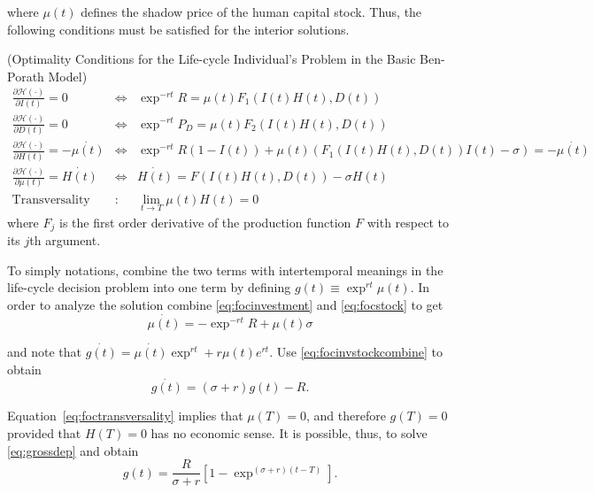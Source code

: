 \noindent where $\mu(t)$ defines the shadow price of the human capital stock. Thus, the following conditions must be satisfied for the interior solutions.

\begin{condition} (Optimality Conditions for the Life-cycle Individual's Problem in the Basic Ben-Porath Model) 
\begin{eqnarray}
\frac{\partial \mathcal{H} (\cdot)}{\partial I(t)} = 0 &\Leftrightarrow& \exp^{-rt}R = \mu(t) F_{1} \left( I(t) H(t), D(t) \right) \label{eq:focinvestment} \\
\frac{\partial \mathcal{H} (\cdot)}{\partial D(t)} = 0 &\Leftrightarrow& \exp^{-rt}P_D = \mu(t) F_{2} \left( I(t) H(t), D(t) \right) \label{eq:focgoods} \\
\frac{\partial \mathcal{H} (\cdot)}{\partial H(t)} = - \dot{\mu(t)} &\Leftrightarrow& \exp^{-rt} R \left( 1 - I (t) \right) + \mu(t) \left(  F_{1} \left( I(t) H(t), D(t) \right)I(t) - \sigma \right) = - \dot{\mu(t)} \label{eq:focstock} \\ 
\frac{\partial \mathcal{H} (\cdot)}{\partial \mu(t)} = \dot{H(t)} &\Leftrightarrow& \dot{H(t)} = F \left( I(t) H(t), D(t) \right) - \sigma H(t) \label{eq:focmotion} \\
\text{Transversality} &:& \lim_{t \rightarrow T} \mu(t) H(t) = 0 \label{eq:foctransversality}
\end{eqnarray}
where $F_j$ is the first order derivative of the production function $F$ with respect to its $j$th argument.
\end{condition}

\indent To simply notations, combine the two terms with intertemporal meanings in the life-cycle decision problem into one term by defining $g(t)\equiv \exp^{rt}\mu(t)$. In order to analyze the solution combine \eqref{eq:focinvestment} and \eqref{eq:focstock} to get 
\begin{equation}
\dot{\mu(t)} = - \exp^{-rt} R + \mu(t) \sigma \label{eq:focinvstockcombine}
\end{equation}

\noindent and note that $\dot{g(t)} = \dot{\mu(t)} \exp^{rt} + r \mu(t) e ^{rt}$. Use \eqref{eq:focinvstockcombine} to obtain 
\begin{equation}
\dot{g(t)} = (\sigma + r ) g(t) - R. \label{eq:grossdep}
\end{equation}

\indent Equation~\eqref{eq:foctransversality} implies that $\mu(T) = 0 $, and therefore $g(T) = 0$ provided that $H(T) = 0$ has no economic sense. It is possible, thus, to solve \eqref{eq:grossdep} and obtain
\begin{equation}
g(t) = \frac{R}{\sigma + r} \left[ 1 - \exp^{(\sigma + r)(t - T)} \right].
\end{equation}

